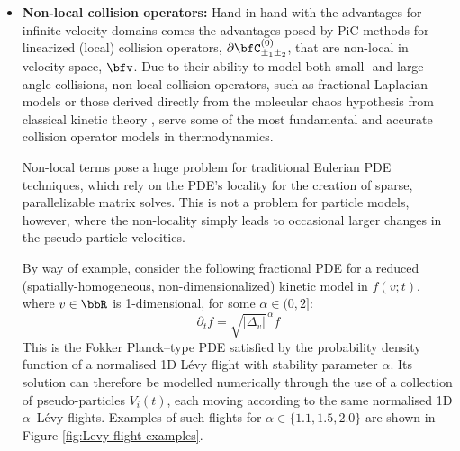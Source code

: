 \begin{itemize}
        \item  {\bf Non-local collision operators:} Hand-in-hand with the advantages for infinite velocity domains comes the advantages posed by PiC methods for linearized (local) collision operators, $\partial\bfC_{\pm_{1}\pm_{2}}^{(0)}$, that are non-local in velocity space, $\bfv$. Due to their ability to model both small- and large-angle collisions, non-local collision operators, such as fractional Laplacian models \cite{Cho_2015, Sakomoto_2016, Kiselev_Schmalian_2019} or those derived directly from the molecular chaos hypothesis from classical kinetic theory \cite{Lerner_Trigg_1991}, serve some of the most fundamental and accurate collision operator models in thermodynamics. 
        
        Non-local terms pose a huge problem for traditional Eulerian PDE techniques, which rely on the PDE's locality for the creation of sparse, parallelizable matrix solves. This is not a problem for particle models, however, where the non-locality simply leads to occasional larger changes in the pseudo-particle velocities.

        By way of example, consider the following fractional PDE for a reduced (spatially-homogeneous, non-dimensionalized) kinetic model in $f(v; t)$, where $v  \in  \bbR$ is 1-dimensional, for some $\alpha  \in  (0, 2]$:
        \begin{equation}
            \partial_{t}f  =  \sqrt{|\Delta_{v}|}^{\,\alpha}f
        \end{equation}
        This is the Fokker Planck--type PDE satisfied by the probability density function of a normalised 1D Lévy flight with stability parameter $\alpha$. Its solution can therefore be modelled numerically through the use of a collection of pseudo-particles $V_{i}(t)$, each moving according to the same normalised 1D $\alpha$--Lévy flights. Examples of such flights for $\alpha  \in  \{1.1, 1.5, 2.0\}$ are shown in Figure \ref{fig:Levy flight examples}.  


\end{itemize}
